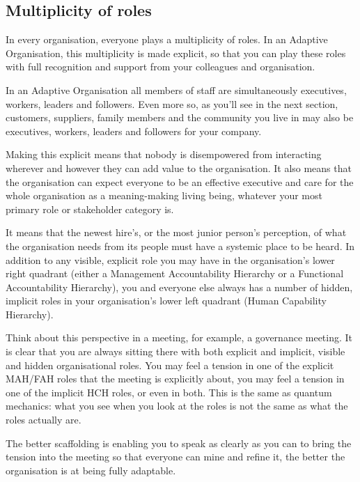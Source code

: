 \subsection{Multiplicity of roles}
In every organisation, everyone plays a multiplicity of roles. In an Adaptive Organisation, this multiplicity is made explicit, so that you can play these roles with full recognition and support from your colleagues and organisation. 


In an Adaptive Organisation all members of staff are simultaneously executives, workers, leaders and followers. Even more so, as you'll see in the next section, customers, suppliers, family members and the community you live in may also be executives, workers, leaders and followers for your company.


Making this explicit means that nobody is disempowered from interacting wherever and however they can add value to the organisation. It also means that the organisation can expect everyone to be an effective executive and care for the whole organisation as a meaning\hyp{}making living being, whatever your most primary role or stakeholder category is.


It means that the newest hire's, or the most junior person's perception, of what the organisation needs from its people must have a systemic place to be heard. In addition to any visible, explicit role you may have in the organisation’s lower right quadrant (either a Management Accountability Hierarchy  or a  Functional Accountability Hierarchy),  you and everyone else always has a number of hidden, implicit roles in your organisation’s lower left quadrant (Human Capability Hierarchy).


Think about this perspective in a meeting, for example, a governance meeting. It is clear that you are always sitting there with both explicit and implicit, visible and hidden organisational roles. You may feel a tension in one of the explicit MAH/FAH roles that the meeting is explicitly about, you may feel a tension in one of the implicit HCH roles, or even in both. This is the same as quantum mechanics: what you see when you look at the roles is not the same as what the roles actually are. 


The better scaffolding is enabling you to speak as clearly as you can to bring the tension into the meeting so that everyone can mine and refine it,  the better the organisation is at being fully adaptable.


